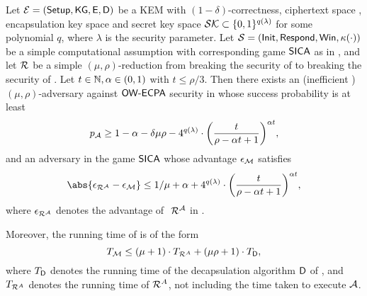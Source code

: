 \begin{theorem}\label{thm:owecpa}
  Let \(\mathcal{E} = (\mathsf{Setup}, \mathsf{KG}, \mathsf{E}, \mathsf{D})\) be a KEM
  with \((1-\delta)\)-correctness,
  ciphertext space \setC, encapsulation key space \keyspace
  and secret key space \(\mathcal{SK} \subset \{0,1\}^{q(\lambda)}\) for some polynomial \(q\),
  where \(\lambda\) is the security parameter.
  Let \(\mathcal{S} = (\mathsf{Init}, \mathsf{Respond}, \mathsf{Win},\kappa(\cdot))\) be a simple computational assumption
  with corresponding game \(\mathsf{SICA}\) as in ,
  and let \(\redR\) be a simple
  \((\mu,\rho)\)-reduction
  from breaking the \OWECPA security of \KEM to breaking
  the \SICA security of \Simple.
  Let \(t \in \mathbb{N}, \alpha \in (0,1)\) with \(t \le \rho/3\).
  Then there exists an (inefficient )
  \((\mu,\rho)\)-adversary \advA against \(\mathsf{OW}\text{-}\mathsf{ECPA}\) security in \KEM
  whose success probability is at least
  \begin{equation}\label{ineq:A}
    p_{\advA} \ge 1 - \alpha - \delta \mu \rho
    - 4^{q(\lambda)} \cdot \left( \frac{t}{\rho - \alpha t + 1} \right)^{\alpha t},
  \end{equation}
  and an adversary \redM in the game \(\mathsf{SICA}\) whose advantage \(\epsilon_{\mathcal{M}}\) satisfies
  \begin{equation}\label{ineq:M}
    \abs{\epsilon_{\redR^{\advA}} - \epsilon_{\redM}} \le 1/\mu + \alpha
    + 4^{q(\lambda)} \cdot \left( \frac{t}{\rho - \alpha t + 1} \right)^{\alpha t},
  \end{equation}
  where \(\epsilon_{\redR^{\advA}}\) denotes the advantage of \(\text{ }\redR^{\advA}\) in \SICA.

  Moreover, the running time of \redM is of the form
  \begin{equation}\label{ineq:M:time}
    T_{\redM} \le (\mu + 1) \cdot T_{\redR^{A}} + (\mu \rho + 1) \cdot T_{\Decaps},
  \end{equation}
  where \(T_{\mathsf{D}}\) denotes the running time of the decapsulation algorithm
  \(\mathsf{D}\) of \KEM, and \(T_{\redR^{A}}\) denotes the running time of \(\redR^{A}\),
  not including the time taken to execute \(\mathcal{A}\).
\end{theorem}

